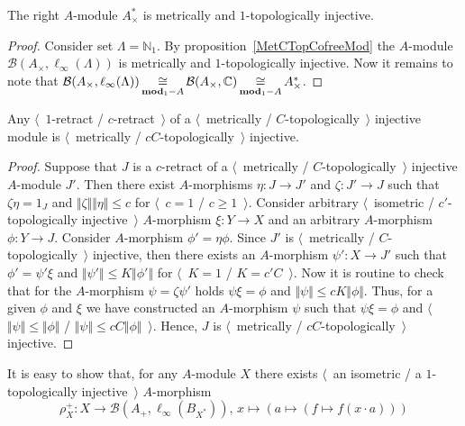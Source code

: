 \begin{proposition}\label{DualOfUnitalAlgIsMetTopInj} The right $A$-module
$A_\times^*$ is metrically and $1$-topologically injective.
\end{proposition}
\begin{proof} Consider set $\Lambda=\mathbb{N}_1$. 
By proposition~\ref{MetCTopCofreeMod} the 
$A$-module $\mathcal{B}(A_\times, \ell_\infty(\Lambda))$ is metrically 
and $1$-topologically injective. Now it remains to note that 
$\mathcal{B}(A_\times, \ell_\infty(\Lambda))
\mathop{\mathbin{\cong}}\limits_{\mathbf{mod}_1-A}\\
\mathcal{B}(A_\times, \mathbb{C})
\mathop{\mathbin{\cong}}\limits_{\mathbf{mod}_1-A}
A_\times^*$.
\end{proof}

\begin{proposition}\label{RetrMetCTopInjIsMetCTopInj} Any 
$\langle$~$1$-retract / $c$-retract~$\rangle$ of a 
$\langle$~metrically / $C$-topologically~$\rangle$ injective module is
$\langle$~metrically / $c C$-topologically~$\rangle$ injective.
\end{proposition}
\begin{proof} Suppose that $J$ is a $c$-retract of a  
$\langle$~metrically / $C$-topologically~$\rangle$ injective $A$-module $J'$.
Then there exist $A$-morphisms $\eta:J\to J'$ and $\zeta: J'\to J$ such that
$\zeta\eta=1_{J}$ and $\Vert\zeta\Vert\Vert\eta\Vert\leq c$ 
for $\langle$~$c=1$ / $c\geq 1$~$\rangle$. Consider 
arbitrary $\langle$~isometric / $c'$-topologically injective~$\rangle$ 
$A$-morphism $\xi:Y\to X$ and an arbitrary $A$-morphism $\phi:Y\to J$. 
Consider $A$-morphism $\phi'=\eta\phi$. Since $J'$ is 
$\langle$~metrically / $C$-topologically~$\rangle$ injective, then there 
exists an $A$-morphism $\psi':X\to J'$ such that $\phi'=\psi'\xi$ 
and $\Vert\psi'\Vert \leq K\Vert\phi'\Vert$ 
for $\langle$~$K=1$ / $K=c' C$~$\rangle$. Now it is routine to check that 
for the $A$-morphism $\psi=\zeta\psi'$ 
holds $\psi\xi=\phi$ and $\Vert\psi\Vert \leq cK\Vert\phi\Vert$. 
Thus, for a given $\phi$ and $\xi$ we have
constructed an $A$-morphism $\psi$ such that $\psi\xi=\phi$  and
$\langle$~$\Vert\psi\Vert\leq\Vert\phi\Vert$ / 
$\Vert \psi\Vert\leq c C\Vert\phi\Vert$~$\rangle$. Hence, $J$ 
is $\langle$~metrically / $c C$-topologically~$\rangle$ injective.
\end{proof}


It is easy to show that, for any $A$-module $X$ there exists 
$\langle$~an isometric / a $1$-topologically injective~$\rangle$ 
$A$-morphism
$$
\rho_X^+:
X\to\mathcal{B}(A_+, \ell_\infty(B_{X^*})),\, 
x\mapsto(a\mapsto(f\mapsto f(x\cdot a)))
$$

